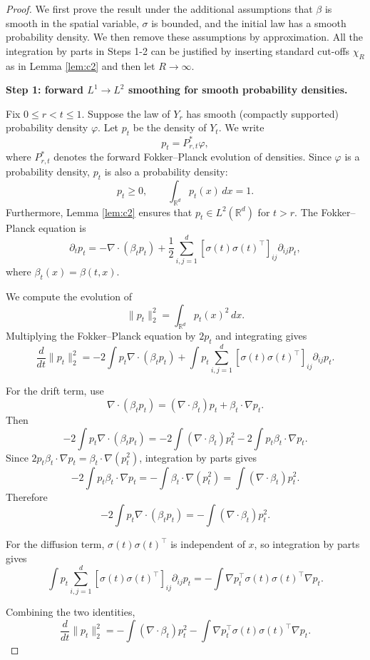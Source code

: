 \documentclass{article}
\newcommand{\1}{\mathbbm{1}}
\numberwithin{equation}{section}
\def\to{\rightarrow}
\begin{document}
\begin{proof}
We first prove the result under the additional assumptions that $\beta$ is
smooth in the spatial variable, $\sigma$ is bounded, and the initial law has
a smooth probability density. We then remove these assumptions by approximation.
All the integration by parts in Steps 1-2 can be justified by inserting standard cut-offs $\chi_R$ as in Lemma \ref{lem:c2} and then let $R\rightarrow\infty$.


{\bf Step 1: forward $L^1\to L^2$ smoothing for smooth probability densities.}

Fix $0\le r<t\le 1$. Suppose the law of $Y_r$ has smooth (compactly supported) probability density
$\varphi$. Let $p_t$ be the density of $Y_t$. We write
$$
p_t=P_{r,t}^\ast \varphi,
$$
where $P_{r,t}^\ast$ denotes the forward Fokker--Planck evolution of densities.
Since $\varphi$ is a probability density, $p_t$ is also a probability density:
$$
p_t\ge 0,
\qquad
\int_{\mathbb R^d}p_t(x)\,dx=1.
$$
Furthermore, Lemma \ref{lem:c2} ensures that $p_{t}\in L^{2}(\mathbb{R}^{d})$ for $t>r$. The Fokker--Planck equation is
$$
\partial_t p_t
=
-\nabla\cdot(\beta_t p_t)
+
\frac12\sum_{i,j=1}^d
[\sigma(t)\sigma(t)^\top]_{ij}\partial_{ij}p_t,
$$
where $\beta_t(x)=\beta(t,x)$.

We compute the evolution of
$$
\|p_t\|_2^2=\int_{\mathbb R^d}p_t(x)^2\,dx.
$$
Multiplying the Fokker--Planck equation by $2p_t$ and integrating gives
$$
\frac{d}{dt}\|p_t\|_2^2
=
-2\int p_t\nabla\cdot(\beta_t p_t)
+
\int p_t
\sum_{i,j=1}^d
[\sigma(t)\sigma(t)^\top]_{ij}\partial_{ij}p_t .
$$

For the drift term, use
$$
\nabla\cdot(\beta_t p_t)
=
(\nabla\cdot\beta_t)p_t+\beta_t\cdot\nabla p_t .
$$
Then
$$
-2\int p_t\nabla\cdot(\beta_t p_t)
=
-2\int(\nabla\cdot\beta_t)p_t^2
-
2\int p_t\beta_t\cdot\nabla p_t .
$$
Since $2p_t\beta_t\cdot\nabla p_t=\beta_t\cdot\nabla(p_t^2)$,
integration by parts gives
$$
-2\int p_t\beta_t\cdot\nabla p_t
=
-\int \beta_t\cdot\nabla(p_t^2)
=
\int(\nabla\cdot\beta_t)p_t^2 .
$$
Therefore
$$
-2\int p_t\nabla\cdot(\beta_t p_t)
=
-\int(\nabla\cdot\beta_t)p_t^2 .
$$

For the diffusion term, $\sigma(t)\sigma(t)^\top$ is independent of $x$, so
integration by parts gives
$$
\int p_t
\sum_{i,j=1}^d
[\sigma(t)\sigma(t)^\top]_{ij}\partial_{ij}p_t
=
-\int
\nabla p_t^\top\sigma(t)\sigma(t)^\top\nabla p_t .
$$

Combining the two identities,
$$
\frac{d}{dt}\|p_t\|_2^2
=
-\int(\nabla\cdot\beta_t)p_t^2
-
\int\nabla p_t^\top\sigma(t)\sigma(t)^\top\nabla p_t .
$$


\end{proof}
\end{document}
